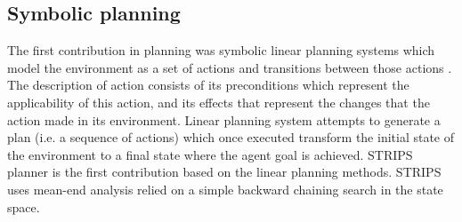 \documentclass[conference]{IEEEtran}
\begin{document}
	\subsection{Symbolic planning}
	\label{sec:symbolic}
	The first contribution in planning was symbolic linear planning systems which model the environment as a set of actions and transitions between those actions \cite{fikes1972strips}. The description of action consists of its preconditions which represent the applicability of this action, and its effects that represent the changes that the action made in its environment. Linear planning system attempts to generate a plan (i.e. a sequence of actions) which once executed transform the initial state of the environment to a final state where the agent goal is achieved. STRIPS planner \cite{fikes1972strips} is the first contribution based on the linear planning methods. STRIPS uses mean-end analysis relied on a simple backward chaining search in the state space. 
	
\end{document}
